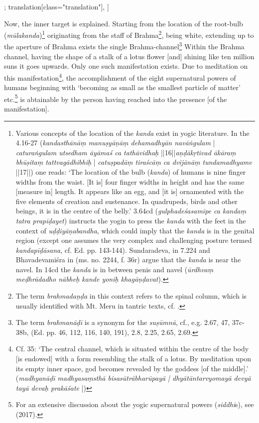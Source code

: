 \begin{alignment}[
  texts=edition[class="edition"];
  translation[class="translation"],
  ]
\begin{translation}
\begin{tlate}[p24_01]
Now, the inner target is explained. Starting from the location of the root-bulb (\textit{mūlakanda})\footnote{Various concepts of the location of the \textit{kanda} exist in yogic literature. In the  4.16-27 (\textit{kandasthānāṃ manuṣyāṇāṃ dehamadhyān navāṅgulam} | \textit{caturaṅgulam utsedham āyāmaś ca tathāvidhaḥ} ||16||\textit{aṇḍākṛtivad ākāraṃ bhūṣitaṃ tattvagādhibhiḥ} | \textit{catuṣpadāṃ tiraścāṃ ca dvijānāṃ tundamadhyame} ||17||) one reads: `The location of the bulb (\textit{kanda}) of humans is nine finger widths from the waist. [It is] four finger widths in height and has the same [measure in] length. It appears like an egg, and [it is] ornamented with the five elements of creation and sustenance. In quadrupeds, birds and other beings, it is in the centre of the belly.'  3.64cd (\textit{gulphadeśasamīpe ca kandaṃ tatra prapīḍayet}) instructs the yogin to press the \emph{kanda} with the feet in the context of \textit{uḍḍiyāṇabandha}, which could imply that the \emph{kanda} is in the genital region (except one assumes the very complex and challenging posture termed \textit{kandapīḍāsana}, cf.  Ed. pp. 143-144). Sundaradeva, in  7.224 and Bhavadevamiśra in  (ms. no. 2244, f. 36r) argue that the \emph{kanda} is near the navel. In  14cd the \textit{kanda} is in between penis and navel (\textit{ūrdhvaṃ meḍhrādadho nābheḥ kande yoniḥ khagāṇḍavat}).} originating from the staff of Brahma\footnote{The term \textit{brahmadaṇḍa} in this context refers to the spinal column, which is usually identified with Mt. Meru in tantric texts, cf. \citeauthor[1988: 360]{stupa}.}, being white, extending up to the aperture of Brahma exists the single Brahma-channel\footnote{The term \textit{brahmanāḍī} is a synonym for the \textit{suṣūmnā}, cf., e.g.  2.67,  47,  37c-38b,  (Ed. pp. 46, 112, 116, 140, 191),  2.8, 2.25, 2.65, 2.69.} Within the Brahma channel, having the shape of a stalk of a lotus flower [and] shining like ten million suns it goes upwards. Only one such manifestation exists. Due to meditation on this manifestation\footnote{Cf.  35: `The central channel, which is situated within the centre of the body [is endowed] with a form resembling the stalk of a lotus. By meditation upon its empty inner space, god becomes revealed by the goddess [of the middle].' (\textit{madhyanāḍī madhyasaṃsthā bisasūtrābharūpayā | dhyātāntarvyomayā devyā tayā devaḥ prakāśate} |)}, the accomplishment of the eight supernatural powers of humans beginning with `becoming as small as the smallest particle of matter' etc.\footnote{For an extensive discussion about the yogic supernatural powers (\textit{siddhi}s), see \citeauthor{yogapowers2017} (2017).} is abtainable by the person having reached into the presence [of the manifestation].%
\end{tlate}
\end{translation}
\end{alignment}
